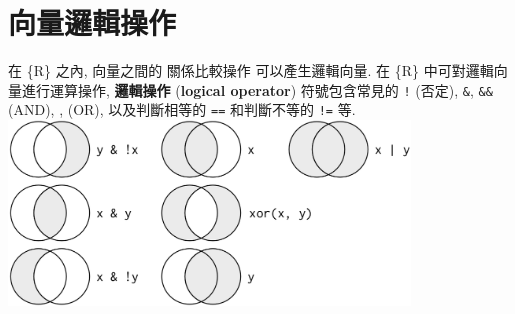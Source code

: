 \documentclass[
]{book}
\begin{document}
\hypertarget{ux5411ux91cfux908fux8f2fux64cdux4f5c}{%
\section{向量邏輯操作}\label{ux5411ux91cfux908fux8f2fux64cdux4f5c}}

在 \{R\} 之內, 向量之間的
關係比較操作
可以產生邏輯向量.
在 \{R\} 中可對邏輯向量進行運算操作,
\textbf{邏輯操作}
(\textbf{logical operator})
符號包含常見的
\texttt{!} (否定),
\texttt{\&}, \texttt{\&\&} (AND), \texttt{\textbar{}} , \texttt{\textbar{}\textbar{}} (OR),
以及判斷相等的
\texttt{==} 和判斷不等的
\texttt{!=} 等.
\includegraphics[width=0.8\textwidth,height=\textheight]{./static/logicplot.png}
\end{document}
